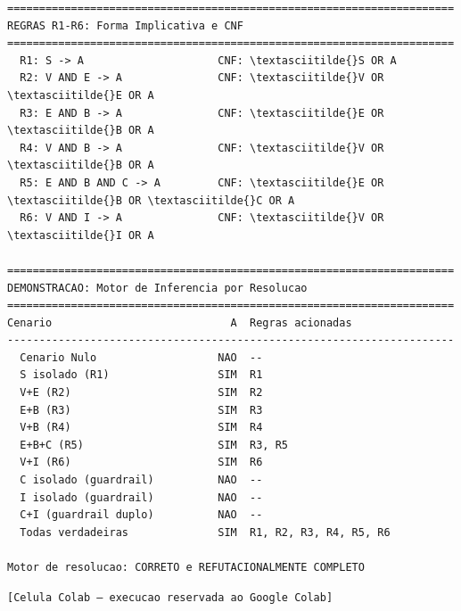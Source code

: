 \documentclass[11pt]{article}
\begin{document}
    \begin{Verbatim}[commandchars=\\\{\}]
======================================================================
REGRAS R1-R6: Forma Implicativa e CNF
======================================================================
  R1: S -> A                     CNF: \textasciitilde{}S OR A
  R2: V AND E -> A               CNF: \textasciitilde{}V OR \textasciitilde{}E OR A
  R3: E AND B -> A               CNF: \textasciitilde{}E OR \textasciitilde{}B OR A
  R4: V AND B -> A               CNF: \textasciitilde{}V OR \textasciitilde{}B OR A
  R5: E AND B AND C -> A         CNF: \textasciitilde{}E OR \textasciitilde{}B OR \textasciitilde{}C OR A
  R6: V AND I -> A               CNF: \textasciitilde{}V OR \textasciitilde{}I OR A

======================================================================
DEMONSTRACAO: Motor de Inferencia por Resolucao
======================================================================
Cenario                            A  Regras acionadas
----------------------------------------------------------------------
  Cenario Nulo                   NAO  --
  S isolado (R1)                 SIM  R1
  V+E (R2)                       SIM  R2
  E+B (R3)                       SIM  R3
  V+B (R4)                       SIM  R4
  E+B+C (R5)                     SIM  R3, R5
  V+I (R6)                       SIM  R6
  C isolado (guardrail)          NAO  --
  I isolado (guardrail)          NAO  --
  C+I (guardrail duplo)          NAO  --
  Todas verdadeiras              SIM  R1, R2, R3, R4, R5, R6

Motor de resolucao: CORRETO e REFUTACIONALMENTE COMPLETO
    \end{Verbatim}

    \begin{Verbatim}[commandchars=\\\{\}]
[Celula Colab — execucao reservada ao Google Colab]
    \end{Verbatim}
\end{document}
